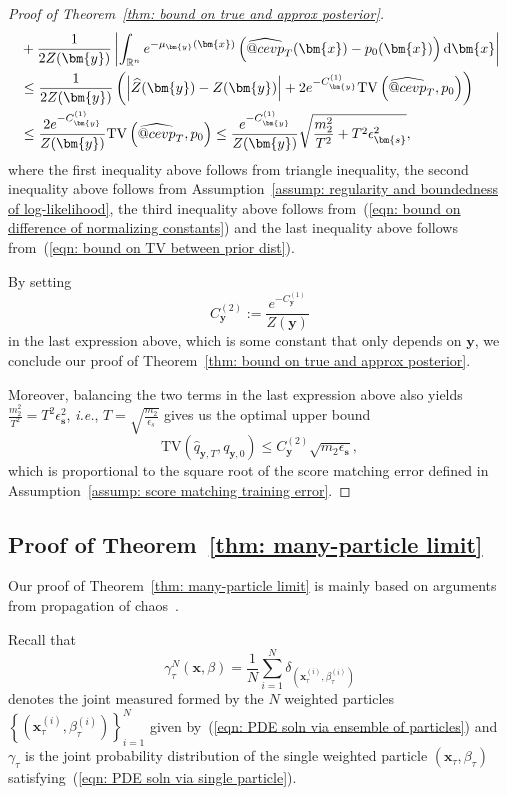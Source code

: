 \documentclass{article}
\makeatletter
\numberwithin{equation}{section}
\def\eqref#1{(\ref{#1})}
\newcommand{\dif}{{\mathrm{d}}}
\def\vs{{\bm{s}}}
\def\vx{{\bm{x}}}
\def\vy{{\bm{y}}}
\newcommand{\TV}{\mathrm{TV}}
\DeclareRobustCommand{\cev}[1]{%
  {\mathpalette\do@cev{#1}}%
}
\newcommand{\do@cev}[2]{%
  \vbox{\offinterlineskip
    \sbox\z@{$\m@th#1 x$}%
    \ialign{##\cr
      \hidewidth\reflectbox{$\m@th#1\vec{}\mkern4mu$}\hidewidth\cr
      \noalign{\kern-\ht\z@}
      $\m@th#1#2$\cr
    }%
  }%
}
\makeatother
\begin{document}
\begin{proof}[Proof of Theorem~\ref{thm: bound on true and approx posterior}]
\begin{equation*}
\begin{aligned}
&+ \frac{1}{2Z(\vy)}\left|\int_{\mathbb{R}^n}e^{-\mu_{\vy}(\vx)}\left(\widehat{\cev{p}}_T(\vx) - p_0(\vx)\right)\dif\vx\right|\\
&\leq \frac{1}{2Z(\vy)}\left(\left|\widehat{Z}(\vy) - Z(\vy)\right| + 2e^{-C^{(1)}_{\vy}}\TV\left(\widehat{\cev{p}}_T,p_0\right)\right)\\
&\leq \frac{2e^{-C^{(1)}_{\vy}}}{Z(\vy)}\TV\left(\widehat{\cev{p}}_T,p_0\right) \leq  \frac{e^{-C^{(1)}_{\vy}}}{Z(\vy)}\sqrt{\frac{m_2^2}{T^2} + T^2\epsilon_{\vs}^2},
\end{aligned}
\end{equation*}
where the first inequality above follows from triangle inequality, the second inequality above follows from Assumption~\ref{assump: regularity and boundedness of log-likelihood}, the third inequality above follows from~\eqref{eqn: bound on difference of normalizing constants} and the last inequality above follows from~\eqref{eqn: bound on TV between prior dist}. 

By setting 
$$
    C^{(2)}_{\vy}:= \frac{e^{-C^{(1)}_{\vy}}}{Z(\vy)}
$$ 
in the last expression above, which is some constant that only depends on $\vy$, we conclude our proof of Theorem~\ref{thm: bound on true and approx posterior}. 

Moreover, balancing the two terms in the last expression above also yields $\frac{m_2^2}{T^2} = T^2\epsilon_{\vs}^2$, \emph{i.e.}, $T = \sqrt{\frac{m_2}{\epsilon_s}}$ gives us the optimal upper bound 
$$
    \TV(\widehat{q}_{\vy,T},q_{\vy,0}) \leq C^{(2)}_{\vy}\sqrt{m_2\epsilon_{\vs}},
$$ 
which is proportional to the square root of the score matching error defined in Assumption~\ref{assump: score matching training error}. 
\end{proof}
\subsection{Proof of Theorem~\ref{thm: many-particle limit}}
\label{proof: mean-field limit}

Our proof of Theorem~\ref{thm: many-particle limit} is mainly based on arguments from propagation of chaos~\cite{sznitman1991topics,lacker2018mean}. 

Recall that 
$$
    \gamma^{N}_\tau(\vx,\beta) = \frac{1}{N}\sum_{i=1}^{N}\delta_{(\vx^{(i)}_\tau,\beta^{(i)}_\tau)}
$$ 
denotes the joint measured formed by the $N$ weighted particles $\left\{\left(\vx^{(i)}_\tau, \beta^{(i)}_\tau\right)\right\}_{i=1}^{N}$ given by~\eqref{eqn: PDE soln via ensemble of particles} and $\gamma_{\tau}$ is the joint probability distribution of the single weighted particle $(\vx_\tau,\beta_\tau)$ satisfying~\eqref{eqn: PDE soln via single particle}. 
\end{document}

